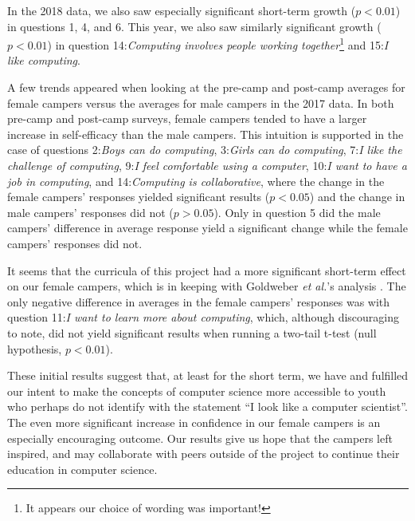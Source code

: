 In the 2018 data, we also saw especially significant short-term
growth ($p < 0.01$) in questions 1, 4, and 6.  This year, we also
saw similarly significant growth ($p < 0.01$) in question
14:\textit{Computing involves people working together}\footnote{It
appears our choice of wording was important!} and 15:\textit{I like
computing}.


A few trends appeared when looking at the pre-camp and post-camp
averages for female campers versus the averages for male campers
in the 2017 data.  In both pre-camp and post-camp surveys, female
campers tended to have a larger increase in self-efficacy than the
male campers. This intuition is supported in the case of questions
2:\textit{Boys can do computing}, 3:\textit{Girls can do computing},
7:\textit{I like the challenge of computing}, 9:\textit{I feel
comfortable using a computer}, 10:\textit{I want to have a job in
computing}, and 14:\textit{Computing is collaborative}, where the
change in the female campers' responses yielded significant results
($p < 0.05$) and the change in male campers' responses did not ($p
> 0.05$). Only in question 5 did the male campers' difference in
average response yield a significant change while the female campers'
responses did not.

It seems that the curricula of this project had a more significant
short-term effect on our female campers, which is in keeping with Goldweber
\textit{et al.}'s analysis \cite{Goldweber2013}.  The only negative
difference in averages in the female campers' responses was with
question 11:\textit{I want to learn more about computing}, which,
although discouraging to note, did not yield significant results
when running a two-tail t-test (null hypothesis, $p < 0.01$).

These initial results suggest that, at least for the short term,
we have and fulfilled our intent to make the concepts of computer
science more accessible to youth who perhaps do not identify with
the statement ``I look like a computer scientist''. The even more
significant increase in confidence in our female campers is an
especially encouraging outcome. Our results give us hope that the
campers left inspired, and may collaborate with peers outside of
the project to continue their education in computer science.

